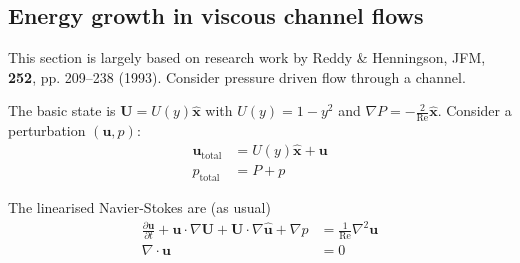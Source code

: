 \documentclass{jknotes}
\renewcommand{\u}{\symbf{u}}
\newcommand{\ReN}{\text{Re}}
\begin{document}
\subsection{Energy growth in viscous channel flows}
This section is largely based on research work by Reddy \& Henningson, JFM,
\textbf{252}, pp. 209--238 (1993). Consider pressure driven flow through a
channel.

\begin{center}
\end{center}

The basic state is $\symbf{U} = U(y)\symbf{\hat{x}}$ with $U(y) = 1-y^2$ and
$\nabla P = -\frac{2}{\ReN}\hat{\symbf{x}}$. Consider a perturbation $(\u,
p)$:
\begin{align}
	\symbf{u}_{\text{total}} &= U(y)\hat{\symbf{x}} + \u \\
	p_{\text{total}} &= P + p 
\end{align}

The linearised Navier-Stokes are (as usual)
\begin{align}
	\frac{\partial \u}{\partial t} + \u \cdot \nabla \symbf{U} +
	\symbf{U} \cdot \nabla \hat{\u} + \nabla p &= \frac{1}{\text{Re}} \nabla^2
	\u \label{eq:l11:1}\\
	\nabla \cdot \u &= 0
\end{align}
\end{document}
